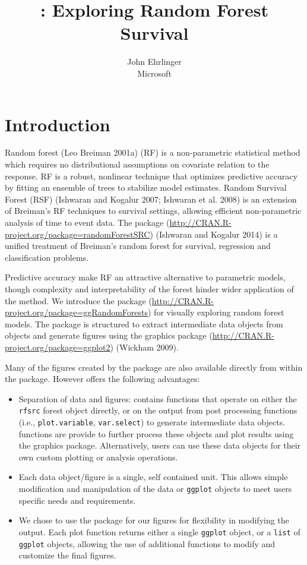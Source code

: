 \documentclass[article, nojss]{jss}
\author{
John Ehrlinger\\Microsoft
}
\title{\pkg{ggRandomForests}: Exploring Random Forest Survival}
\begin{document}
\section{Introduction}\label{introduction}

Random forest (Leo Breiman 2001a) (RF) is a non-parametric statistical
method which requires no distributional assumptions on covariate
relation to the response. RF is a robust, nonlinear technique that
optimizes predictive accuracy by fitting an ensemble of trees to
stabilize model estimates. Random Survival Forest (RSF) (Ishwaran and
Kogalur 2007; Ishwaran et al. 2008) is an extension of Breiman's RF
techniques to survival settings, allowing efficient non-parametric
analysis of time to event data. The  package
(\url{http://CRAN.R-project.org/package=randomForestSRC}) (Ishwaran and
Kogalur 2014) is a unified treatment of Breiman's random forest for
survival, regression and classification problems.

Predictive accuracy make RF an attractive alternative to parametric
models, though complexity and interpretability of the forest hinder
wider application of the method. We introduce the 
package (\url{http://CRAN.R-project.org/package=ggRandomForests}) for
visually exploring random forest models. The 
package is structured to extract intermediate data objects from
 objects and generate figures using the
 graphics package
(\url{http://CRAN.R-project.org/package=ggplot2}) (Wickham 2009).

Many of the figures created by the  package are
also available directly from within the  package.
However  offers the following advantages:

\begin{itemize}
\item
  Separation of data and figures:  contains
  functions that operate on either the \texttt{rfsrc} forest object
  directly, or on the output from  post processing
  functions (i.e., \texttt{plot.variable}, \texttt{var.select}) to
  generate intermediate  data objects.
   functions are provide to further process these
  objects and plot results using the  graphics package.
  Alternatively, users can use these data objects for their own custom
  plotting or analysis operations.
\item
  Each data object/figure is a single, self contained unit. This allows
  simple modification and manipulation of the data or \texttt{ggplot}
  objects to meet users specific needs and requirements.
\item
  We chose to use the  package for our figures for
  flexibility in modifying the output. Each  plot
  function returns either a single \texttt{ggplot} object, or a
  \texttt{list} of \texttt{ggplot} objects, allowing the use of
  additional  functions to modify and customize the final
  figures.
\end{itemize}
\end{document}
